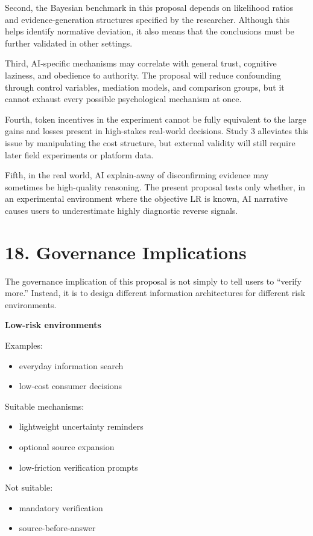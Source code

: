 Second, the Bayesian benchmark in this proposal depends on likelihood ratios and evidence-generation structures specified by the researcher. Although this helps identify normative deviation, it also means that the conclusions must be further validated in other settings.

Third, AI-specific mechanisms may correlate with general trust, cognitive laziness, and obedience to authority. The proposal will reduce confounding through control variables, mediation models, and comparison groups, but it cannot exhaust every possible psychological mechanism at once.

Fourth, token incentives in the experiment cannot be fully equivalent to the large gains and losses present in high-stakes real-world decisions. Study 3 alleviates this issue by manipulating the cost structure, but external validity will still require later field experiments or platform data.

Fifth, in the real world, AI explain-away of disconfirming evidence may sometimes be high-quality reasoning. The present proposal tests only whether, in an experimental environment where the objective LR is known, AI narrative causes users to underestimate highly diagnostic reverse signals.

\section*{18. Governance Implications}

The governance implication of this proposal is not simply to tell users to ``verify more.'' Instead, it is to design different information architectures for different risk environments.

\textbf{Low-risk environments}

Examples:
\begin{itemize}[leftmargin=1.5em]
\item everyday information search
\item low-cost consumer decisions
\end{itemize}

Suitable mechanisms:
\begin{itemize}[leftmargin=1.5em]
\item lightweight uncertainty reminders
\item optional source expansion
\item low-friction verification prompts
\end{itemize}

Not suitable:
\begin{itemize}[leftmargin=1.5em]
\item mandatory verification
\item source-before-answer
\end{itemize}

